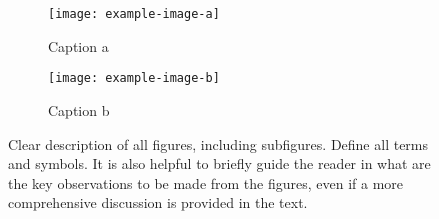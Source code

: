 \documentclass[manuscript=article]{achemso}
\begin{document}
\begin{figure}[htp]
\centering
\begin{subfigure}[b]{0.45\textwidth}
    \centering
	\texttt{[image: example-image-a]}
	\caption{\label{subfig:descriptiona}Caption a}
\end{subfigure}
\begin{subfigure}[b]{0.45\textwidth}
    \centering
	\texttt{[image: example-image-b]}
	\caption{\label{subfig:descriptionb}Caption b}
\end{subfigure}
\caption{\label{fig:overalldescription} Clear description of all figures, including subfigures. Define all terms and symbols. It is also helpful to briefly guide the reader in what are the key observations to be made from the figures, even if a more comprehensive discussion is provided in the text.}
\end{figure}
\end{document}
